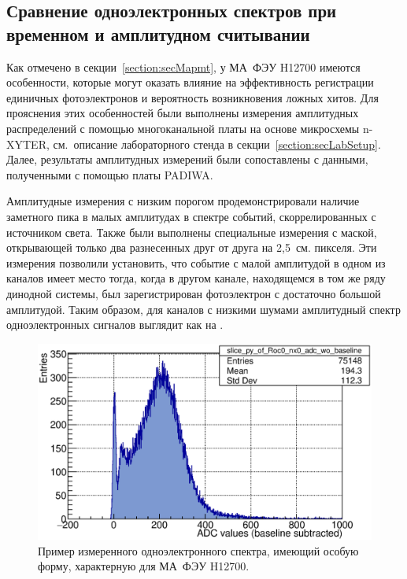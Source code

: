 \subsection{Сравнение одноэлектронных спектров при временном и амплитудном считывании}\label{section:secNxVsPadiwa}

Как отмечено в секции~\ref{section:secMapmt}, у МА~ФЭУ H12700 имеются особенности, которые могут оказать влияние на эффективность регистрации единичных фотоэлектронов и вероятность возникновения ложных хитов. Для прояснения этих особенностей были выполнены измерения амплитудных распределений с помощью многоканальной платы на основе микросхемы n-XYTER, см.~описание лабораторного стенда в секции~\ref{section:secLabSetup}. Далее, результаты амплитудных измерений были сопоставлены с данными, полученными с помощью платы PADIWA.

Амплитудные измерения с низким порогом продемонстрировали наличие заметного пика в малых амплитудах в спектре событий, скоррелированных с источником света. Также были выполнены специальные измерения с маской, открывающей только два разнесенных друг от друга на 2,5~см. пикселя. Эти измерения позволили установить, что событие с малой амплитудой в одном из каналов имеет место тогда, когда в другом канале, находящемся в том же ряду динодной системы, был зарегистрирован фотоэлектрон с достаточно большой амплитудой. Таким образом, для каналов с низкими шумами амплитудный спектр одноэлектронных сигналов выглядит как на .

\begin{figure}[H]
\centering
\includegraphics[width=1.0\textwidth]{pictures/30_PeculiarSpectrum.eps}
\caption{Пример измеренного одноэлектронного спектра, имеющий особую форму, характерную для МА~ФЭУ H12700.}
\label{fig:PeculiarSpectrum}
\end{figure}

